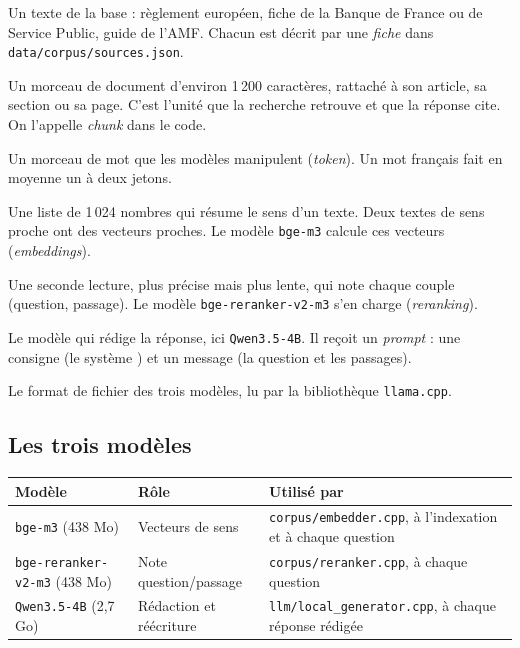 \documentclass[11pt,a4paper]{article}
\newcommand{\fichier}[1]{\texttt{#1}}
\begin{document}
\begin{description}[style=nextline, leftmargin=1.2cm]
  \item[Document] Un texte de la base : règlement européen, fiche de la Banque de France ou de Service Public, guide de l'AMF. Chacun est décrit par une \emph{fiche} dans \fichier{data/corpus/sources.json}.
  \item[Passage] Un morceau de document d'environ 1\,200 caractères, rattaché à son article, sa section ou sa page. C'est l'unité que la recherche retrouve et que la réponse cite. On l'appelle \emph{chunk} dans le code.
  \item[Jeton] Un morceau de mot que les modèles manipulent (\emph{token}). Un mot français fait en moyenne un à deux jetons.
  \item[Vecteur] Une liste de 1\,024 nombres qui résume le sens d'un texte. Deux textes de sens proche ont des vecteurs proches. Le modèle \texttt{bge-m3} calcule ces vecteurs (\emph{embeddings}).
  \item[Reclassement] Une seconde lecture, plus précise mais plus lente, qui note chaque couple (question, passage). Le modèle \texttt{bge-reranker-v2-m3} s'en charge (\emph{reranking}).
  \item[Modèle de langage] Le modèle qui rédige la réponse, ici \texttt{Qwen3.5-4B}. Il reçoit un \emph{prompt} : une consigne (le \og système \fg) et un message (la question et les passages).
  \item[GGUF] Le format de fichier des trois modèles, lu par la bibliothèque \texttt{llama.cpp}.
\end{description}

\subsection{Les trois modèles}

\begin{center}
\small
\begin{tabularx}{\linewidth}{@{}l l X@{}}
\toprule
Modèle & Rôle & Utilisé par \\
\midrule
\texttt{bge-m3} (438 Mo) & Vecteurs de sens & \fichier{corpus/embedder.cpp}, à l'indexation et à chaque question \\
\texttt{bge-reranker-v2-m3} (438 Mo) & Note question/passage & \fichier{corpus/reranker.cpp}, à chaque question \\
\texttt{Qwen3.5-4B} (2,7 Go) & Rédaction et réécriture & \fichier{llm/local\_generator.cpp}, à chaque réponse rédigée \\
\bottomrule
\end{tabularx}
\end{center}
\end{document}
